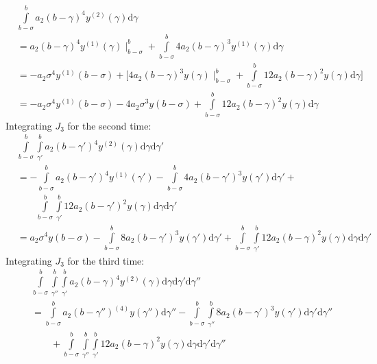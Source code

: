 \documentclass{article}
\begin{document}
\begin{equation}
\begin{split}
	&\int\limits_{b-\sigma}^{b}a_2(b-\gamma)^{4}y^{(2)}(\gamma)\mathrm{d}\gamma\\
	&=a_2(b-\gamma)^{4}y^{(1)}(\gamma)\mid_{b-\sigma}^{b} + \int\limits_{b-\sigma}^{b}4a_2(b-\gamma)^{3}y^{(1)}(\gamma)\mathrm{d}\gamma\\
	&=-a_2\sigma^{4}y^{(1)}(b-\sigma) + \bigg[4a_2(b-\gamma)^{3}y(\gamma)\mid_{b-\sigma}^{b} + \int\limits_{b-\sigma}^{b}12a_2(b-\gamma)^{2}y(\gamma)\mathrm{d}\gamma\bigg]\\
	&=-a_2\sigma^{4}y^{(1)}(b-\sigma) - 4a_2\sigma^{3}y(b-\sigma) + \int\limits_{b-\sigma}^{b}12a_2(b-\gamma)^{2}y(\gamma)\mathrm{d}\gamma
\end{split}
\end{equation}
Integrating $J_3$ for the second time:
\begin{equation}
\begin{split}
	&\int\limits_{b-\sigma}^{b}\int\limits_{\gamma'}^{b}a_2(b-\gamma')^{4}y^{(2)}(\gamma)\mathrm{d}\gamma\mathrm{d}\gamma'\\
	&=-\int\limits_{b-\sigma}^{b}a_2(b-\gamma')^{4}y^{(1)}(\gamma') - \int\limits_{b-\sigma}^{b}4a_2(b-\gamma')^{3}y(\gamma')\mathrm{d}\gamma' +\\&\qquad{} \int\limits_{b-\sigma}^{b}\int\limits_{\gamma'}^{b}12a_2(b-\gamma')^{2}y(\gamma)\mathrm{d}\gamma\mathrm{d}\gamma'\\
	&=a_2\sigma^{4}y(b-\sigma) - \int\limits_{b-\sigma}^{b}8a_2(b-\gamma')^{3}y(\gamma')\mathrm{d}\gamma' + \int\limits_{b-\sigma}^{b}\int\limits_{\gamma'}^{b}12a_2(b-\gamma)^{2}y(\gamma)\mathrm{d}\gamma\mathrm{d}\gamma'
\end{split}
\end{equation}
Integrating $J_3$ for the third time:
\begin{equation}
\begin{split}
	&\int\limits_{b-\sigma}^{b}\int\limits_{\gamma''}^{b}\int\limits_{\gamma'}^{b}a_2(b-\gamma)^{4}y^{(2)}(\gamma)\mathrm{d}\gamma\mathrm{d}\gamma'\mathrm{d}\gamma''\\
	&=\int\limits_{b-\sigma}^{b}a_2(b-\gamma'')^{(4)}y(\gamma'')\mathrm{d}\gamma'' - \int\limits_{b-\sigma}^{b}\int\limits_{\gamma''}^{b}8a_2(b-\gamma')^{3}y(\gamma')\mathrm{d}\gamma'\mathrm{d}\gamma''\\
	&\qquad{} + \int\limits_{b-\sigma}^{b}\int\limits_{\gamma''}^{b}\int\limits_{\gamma'}^{b}12a_2(b-\gamma)^{2}y(\gamma)\mathrm{d}\gamma\mathrm{d}\gamma'\mathrm{d}\gamma''
\end{split}
\end{equation}
\end{document}
